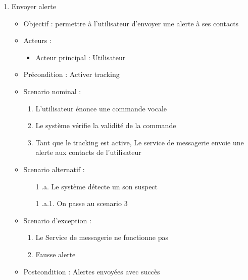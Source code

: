 \begin{enumerate}[label=\alph*.]
	\item Envoyer alerte
	\begin{itemize}
		\item Objectif : permettre à l’utilisateur d’envoyer une alerte à ses contacts
		\item Acteurs :
		\begin{itemize}
			\item Acteur principal : Utilisateur
		\end{itemize}
		\item Précondition : Activer tracking
		\item Scenario nominal :
		\begin{enumerate}[label=\arabic*.]
			\item L’utilisateur énonce une commande vocale
			\item Le système vérifie la validité de la commande
			\item Tant que le tracking est active, Le service de messagerie envoie une alerte aux contacts de l’utilisateur
		\end{enumerate}
		\item Scenario alternatif :
		\begin{enumerate}[label=\arabic*.]
			\item[1] .a. Le système détecte un son suspect
			\item[1] .a.1. On passe au scenario 3
		\end{enumerate}
		\item Scenario d’exception : 
		\begin{enumerate}[label=\arabic*.]
			\item Le Service de messagerie ne fonctionne pas
			\item Fausse alerte
		\end{enumerate}
		\item Postcondition : Alertes envoyées avec succès
	\end{itemize}
	

\end{enumerate}
